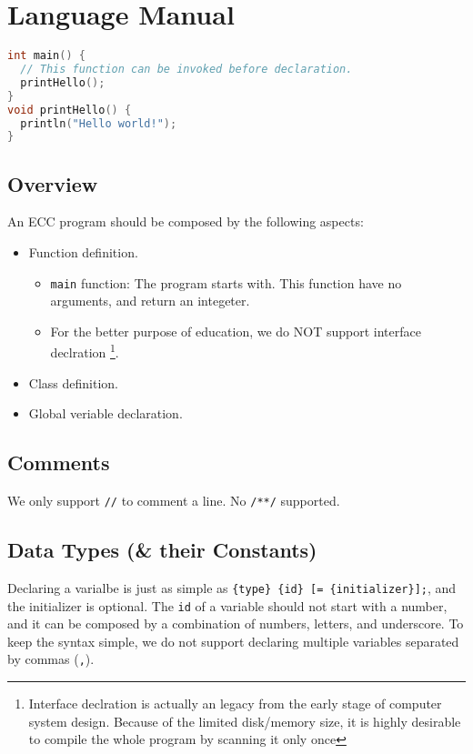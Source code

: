 \documentclass{article}
\begin{document}
\section{Language Manual}

\begin{lstlisting}[caption=Hello world!\label{code:hw}, language=C]
int main() {
  // This function can be invoked before declaration.
  printHello();
}
void printHello() {
  println("Hello world!");
}
\end{lstlisting}

\subsection{Overview}

An ECC program should be composed by the following aspects:

\begin{itemize}
  \item Function definition.
    \begin{itemize}
      \item \texttt{main} function: The program starts with. This function have no arguments, and return an integeter.
      \item For the better purpose of education, we do NOT support interface declration
	\footnote{Interface declration is actually an legacy from the early stage of computer system design. Because of the
	limited disk/memory size, it is highly desirable to compile the whole program by scanning it only once}.
    \end{itemize}
  \item Class definition.
  \item Global veriable declaration.
\end{itemize}

\subsection{Comments}

We only support \texttt{//} to comment a line. No \texttt{/**/} supported.

\subsection{Data Types (\& their Constants)}
Declaring a varialbe is just as simple as \texttt{\{type\} \{id\} [= \{initializer\}];},
and the initializer is optional. The \texttt{id} of a variable should not start with a
number, and it can be composed by a combination of numbers, letters, and underscore.
To keep the syntax simple, we do not support declaring multiple variables separated by
commas (\texttt{,}).
\end{document}
